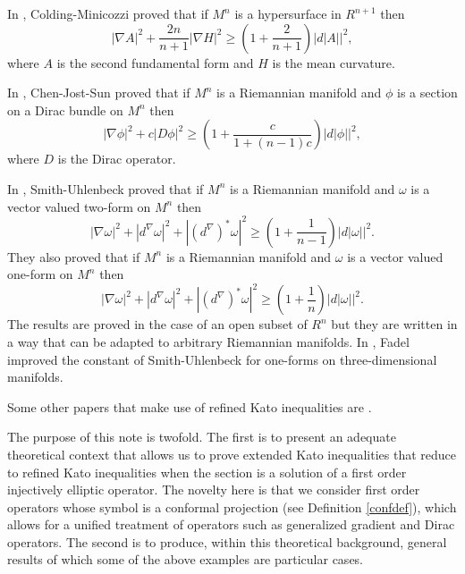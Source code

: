 \documentclass[12pt]{amsart} %
\theoremstyle{definition}
\numberwithin{equation}{section}
\begin{document}
In \cite{CM2012}, Colding-Minicozzi proved that if $M^{n}$ is a
hypersurface in $R^{n+1}$ then
\[
\left|\nabla A\right|^{2}+\frac{2n}{n+1}\left|\nabla H\right|^{2}\geq\left(1+\frac{2}{n+1}\right)\left|d\left|A\right|\right|^{2},
\]
where $A$ is the second fundamental form and $H$ is the mean curvature.

In \cite{CJS2014}, Chen-Jost-Sun proved that if $M^{n}$ is a Riemannian
manifold and $\phi$ is a section on a Dirac bundle on $M^n$ then
\[
\left|\nabla\phi\right|^{2}+c\left|D\phi\right|^{2}\geq\left(1+\frac{c}{1+\left(n-1\right)c}\right)\left|d\left|\phi\right|\right|^{2},
\]
where $D$ is the Dirac operator.


In \cite{SU2019}, Smith-Uhlenbeck proved that if $M^{n}$ is a Riemannian
manifold and $\omega$ is a vector valued two-form on $M^{n}$ then
\[
\left|\nabla\omega\right|^{2}+\left|d^\nabla \omega\right|^{2}+\left|(d^\nabla)^{*}\omega\right|^{2}\geq\left(1+\frac{1}{n-1}\right)\left|d\left|\omega\right|\right|^{2}.
\]
They also proved that if $M^{n}$ is a Riemannian manifold and $\omega$
is a vector valued one-form on $M^{n}$ then
\[
\left|\nabla\omega\right|^{2}+\left|d^\nabla \omega\right|^{2}+\left|(d^\nabla)^{*}\omega\right|^{2}\geq\left(1+\frac{1}{n}\right)\left|d\left|\omega\right|\right|^{2}.
\]
The results are proved in the case of an open subset of $R^{n}$ but
they are written in a way that can be adapted to arbitrary Riemannian
manifolds. In \cite{F2023}, Fadel improved the constant of Smith-Uhlenbeck for
one-forms on three-dimensional manifolds.

Some other papers that make use of refined Kato inequalities are \cite{CB2011,GKS2018,S1991,TV2005a,TV2005b}. 

The purpose of this note is twofold. The first is to present an adequate theoretical context that allows us to prove extended Kato inequalities that reduce to refined Kato inequalities when the section is a solution of a first order injectively elliptic operator. The novelty here is that we consider first order operators whose symbol is a conformal projection (see Definition \ref{confdef}), which allows for a unified treatment of operators such as generalized gradient and Dirac operators. The second is to produce, within this theoretical background, general results of which some of the above examples are particular cases.
\end{document}
